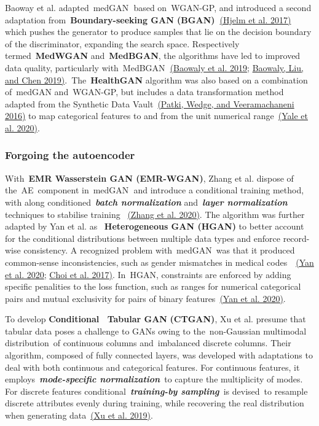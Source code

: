 \documentclass[10pt]{article}
\begin{document}
Baoway et al. adapted~medGAN\textbf{~}based on~WGAN-GP, and introduced a
second adaptation from~\textbf{Boundary-seeking GAN
(BGAN)~}\hyperref[csl:44]{(Hjelm et al. 2017)} which pushes the generator to produce samples
that lie on the decision boundary of the discriminator, expanding the
search space. Respectively termed~\textbf{MedWGAN} and~\textbf{MedBGAN},
the algorithms have led to improved data quality, particularly
with~MedBGAN\textbf{~}\hyperref[csl:29]{(Baowaly et al. 2019}; \hyperref[csl:28]{Baowaly, Liu, and Chen 2019)}.~The~\textbf{HealthGAN}
algorithm was also based on a combination of~medGAN and~WGAN-GP, but
includes a data transformation method adapted from the Synthetic Data
Vault~\hyperref[csl:45]{(Patki, Wedge, and Veeramachaneni 2016)} to map categorical features to and from the
unit numerical range~\hyperref[csl:19]{(Yale et al. 2020)}. ~

\subsubsection{}

{\label{767367}}\par\null

\subsubsection{Forgoing the autoencoder}\label{noauto}

With~\textbf{EMR Wasserstein GAN (EMR-WGAN)}, Zhang et al. dispose of
the~AE~component in~medGAN\textbf{~}and introduce a conditional training
method, with along conditioned~\textbf{\emph{batch normalization}}
and~\emph{\textbf{layer normalization}} techniques to stabilise training
~\hyperref[csl:32]{(Zhang et al. 2020)}. The algorithm was further adapted by Yan et al. as
~\textbf{Heterogeneous GAN (HGAN)} to better account for the conditional
distributions between multiple data types and enforce record-wise
consistency. A recognized problem with~medGAN~was that it produced
common-sense inconsistencies, such as gender mismatches in medical
codes~~\hyperref[csl:46]{(Yan et al. 2020}; \hyperref[csl:47]{Choi et al. 2017)}. In~HGAN, constraints are enforced by adding
specific penalities to the loss function, such as ranges for numerical
categorical pairs and mutual exclusivity for pairs of binary
features~\hyperref[csl:46]{(Yan et al. 2020)}.~

To develop \textbf{Conditional~ Tabular GAN} \textbf{(CTGAN)}, Xu et al.
presume that tabular data poses a challenge to GANs owing to
the~non-Gaussian multimodal distribution~of continuous columns
and~imbalanced discrete columns. Their algorithm, composed of fully
connected layers, was developed with adaptations to deal with both
continuous and categorical features. For continuous features, it
employs~\emph{\textbf{mode-specific normalization}}~to capture the
multiplicity of modes. For discrete features
conditional~\emph{\textbf{training-by sampling}~}is devised~to resample
discrete attributes evenly during training, while recovering the real
distribution when generating data~\hyperref[csl:13]{(Xu et al. 2019)}.~
\end{document}
